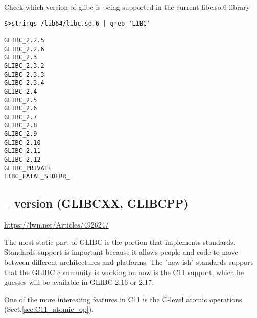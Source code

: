 Check which version of glibc is being supported in the current libc.so.6 library
\begin{verbatim}
$>strings /lib64/libc.so.6 | grep 'LIBC'

GLIBC_2.2.5
GLIBC_2.2.6
GLIBC_2.3
GLIBC_2.3.2
GLIBC_2.3.3
GLIBC_2.3.4
GLIBC_2.4
GLIBC_2.5
GLIBC_2.6
GLIBC_2.7
GLIBC_2.8
GLIBC_2.9
GLIBC_2.10
GLIBC_2.11
GLIBC_2.12
GLIBC_PRIVATE
LIBC_FATAL_STDERR_
\end{verbatim}


\subsection{-- version (GLIBCXX, GLIBCPP)}
\label{sec:glibc-version}
\label{sec:GLIBCXX}
\label{sec:GLIBCPP}

\url{https://lwn.net/Articles/492624/}

The most static part of GLIBC is the portion that implements standards.
Standards support is important because it allows people and code to move between
different architectures and platforms. The "new-ish" standards support that the
GLIBC community is working on now is the C11 support, which he guesses will be
available in GLIBC 2.16 or 2.17.

One of the more interesting features in C11 is the C-level atomic operations
(Sect.\ref{sec:C11_atomic_op}).

